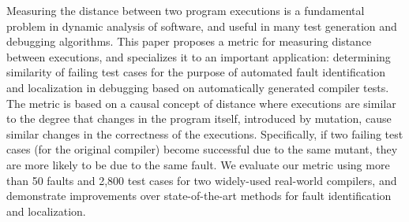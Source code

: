 Measuring the distance between two program executions is a fundamental problem in dynamic analysis of software, and useful in many test generation and debugging algorithms.  This paper proposes a metric for measuring distance between executions, and specializes it to an important application: determining similarity of failing test cases for the purpose of automated fault identification and localization in debugging based on automatically generated compiler tests.  The metric is based on a causal concept of distance where executions are similar to the degree that changes in the program itself, introduced by mutation, cause similar changes in the correctness of the executions.  Specifically, if two failing test cases (for the original compiler) become successful due to the same mutant, they are more likely to be due to the same fault.  We evaluate our metric using more than 50 faults and 2,800 test cases for two widely-used real-world compilers, and demonstrate improvements over state-of-the-art methods for fault identification and localization.  